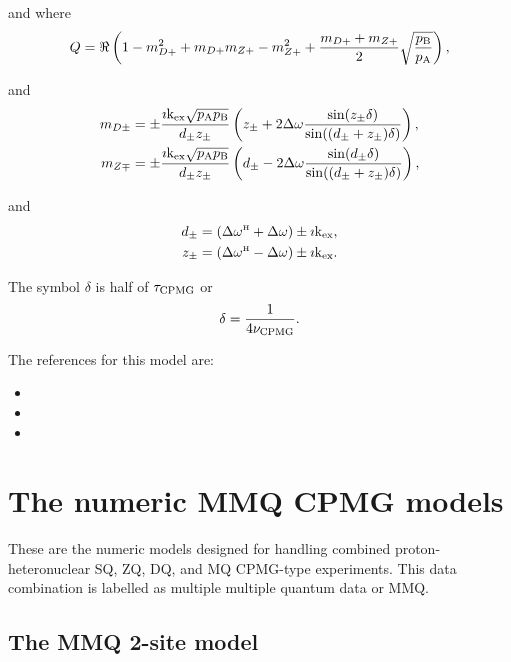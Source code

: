and where
\begin{equation}
    Q = \Re \left( 1 - m_{D+}^2 + m_{D+} m_{Z+} - m_{Z+}^2 + \frac{m_{D+} + m_{Z+}}{2} \sqrt{\frac{p_\textrm{B}}{p_\textrm{A}}} \right),
\end{equation}

and
\begin{align}
    m_{D\pm} &= \pm \frac{\imath\textrm{k}_\textrm{ex}\sqrt{p_\textrm{A}p_\textrm{B}}}{d_\pm z_\pm} \left( z_\pm + 2\Delta\omega \frac{\sin(z_\pm\delta)}{\sin((d_\pm + z_\pm)\delta)} \right), \\
    m_{Z\mp} &= \pm \frac{\imath\textrm{k}_\textrm{ex}\sqrt{p_\textrm{A}p_\textrm{B}}}{d_\pm z_\pm} \left( d_\pm - 2\Delta\omega \frac{\sin(d_\pm\delta)}{\sin((d_\pm + z_\pm)\delta)} \right),
\end{align}

and
\begin{align}
    d_\pm    &= \left( \Delta\omega^{\scriptscriptstyle\mathrm{H}} + \Delta\omega \right) \pm \imath\textrm{k}_\textrm{ex}, \\
    z_\pm    &= \left( \Delta\omega^{\scriptscriptstyle\mathrm{H}} - \Delta\omega \right) \pm \imath\textrm{k}_\textrm{ex}.
\end{align}

The symbol $\delta$ is half of $\tau_\textrm{CPMG}$ or
\begin{equation}
    \delta = \frac{1}{4\nu_\textrm{CPMG}}.
\end{equation}

The references for this model are:
\begin{itemize}
\item {}
\item {}
\item {}
\end{itemize}




\section{The numeric MMQ CPMG models}
\label{sect: dispersion: numeric MMQ CPMG models}

These are the numeric models designed for handling combined proton-heteronuclear SQ, ZQ, DQ, and MQ CPMG-type experiments.
This data combination is labelled as multiple multiple quantum data or MMQ.



\subsection{The MMQ 2-site model}
\label{sect: dispersion: MMQ 2-site model}

